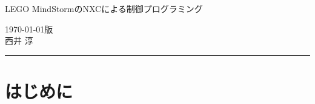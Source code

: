 \documentclass[11pt]{jarticle}
\begin{document}
\pagestyle{empty}
\begin{center}
{\LARGE LEGO MindStormのNXCによる制御プログラミング}
\end{center}
\begin{flushright}
\today 版\\
西井 淳
\end{flushright}
\vspace{-0.6cm}
\rule{\linewidth}{0.5pt}

\vspace{-0.6cm}
{\small
  \tableofcontents
}

\pagestyle{fancy}
\def\baselinestretch{1.05}


\section{はじめに}

\begin{figure}\vspace{-1cm}
\begin{center}
\end{center}
\end{figure}
\end{document}
